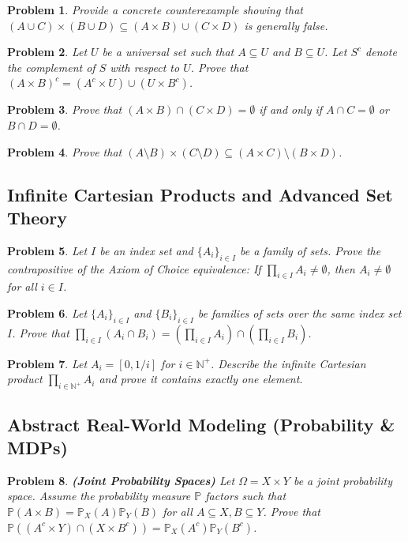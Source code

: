 \documentclass[11pt]{article}
\newtheorem{problem}{Problem}
\begin{document}
\begin{problem}
Provide a concrete counterexample showing that $(A \cup C) \times (B \cup D) \subseteq (A \times B) \cup (C \times D)$ is generally false.
\end{problem}

\begin{problem}
Let $U$ be a universal set such that $A \subseteq U$ and $B \subseteq U$. Let $S^c$ denote the complement of $S$ with respect to $U$. Prove that $(A \times B)^c = (A^c \times U) \cup (U \times B^c)$.
\end{problem}

\begin{problem}
Prove that $(A \times B) \cap (C \times D) = \emptyset$ if and only if $A \cap C = \emptyset$ or $B \cap D = \emptyset$.
\end{problem}

\begin{problem}
Prove that $(A \setminus B) \times (C \setminus D) \subseteq (A \times C) \setminus (B \times D)$.
\end{problem}

\subsection{Infinite Cartesian Products and Advanced Set Theory}
\begin{problem}
Let $I$ be an index set and $\{A_i\}_{i \in I}$ be a family of sets. Prove the contrapositive of the Axiom of Choice equivalence: If $\prod_{i \in I} A_i \neq \emptyset$, then $A_i \neq \emptyset$ for all $i \in I$.
\end{problem}

\begin{problem}
Let $\{A_i\}_{i \in I}$ and $\{B_i\}_{i \in I}$ be families of sets over the same index set $I$. Prove that $\prod_{i \in I} (A_i \cap B_i) = \left(\prod_{i \in I} A_i\right) \cap \left(\prod_{i \in I} B_i\right)$.
\end{problem}

\begin{problem}
Let $A_i = [0, 1/i]$ for $i \in \mathbb{N}^+$. Describe the infinite Cartesian product $\prod_{i \in \mathbb{N}^+} A_i$ and prove it contains exactly one element.
\end{problem}

\subsection{Abstract Real-World Modeling (Probability \& MDPs)}
\begin{problem}
\textbf{(Joint Probability Spaces)} Let $\Omega = X \times Y$ be a joint probability space. Assume the probability measure $\mathbb{P}$ factors such that $\mathbb{P}(A \times B) = \mathbb{P}_X(A)\mathbb{P}_Y(B)$ for all $A \subseteq X, B \subseteq Y$. Prove that $\mathbb{P}((A^c \times Y) \cap (X \times B^c)) = \mathbb{P}_X(A^c)\mathbb{P}_Y(B^c)$.
\end{problem}
\end{document}
